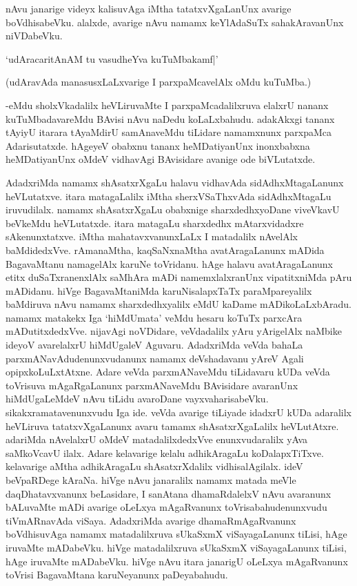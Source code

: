 nAvu janarige videyx kalisuvAga iMtha tatatxvXgaLanUnx avarige boVdhisabeVku. alalxde, avarige nAvu namamx keYlAdaSuTx sahakAravanUnx niVDabeVku.

\begin{shloka}
`udAracaritAnAM tu vasudheYva kuTuMbakamf|'
\end{shloka}

(udAravAda manasusxLaLxvarige I parxpaMcavelAlx oMdu kuTuMba.)

-eMdu sholxVkadalilx heVLiruvaMte I parxpaMcadalilxruva elalxrU nananx kuTuMbadavareMdu BAvisi nAvu naDedu koLaLxbahudu. adakAkxgi tananx tAyiyU itarara tAyaMdirU samAnaveMdu tiLidare namamxnunx parxpaMca Adarisutatxde. hAgeyeV obabxnu tananx heMDatiyanUnx inonxbabxna heMDatiyanUnx oMdeV vidhavAgi BAvisidare avanige ode biVLutatxde.

AdadxriMda namamx shAsatxrXgaLu halavu vidhavAda sidAdhxMtagaLanunx heVLutatxve. itara matagaLalilx iMtha sherxVSaThxvAda sidAdhxMtagaLu iruvudilalx. namamx shAsatxrXgaLu obabxnige sharxdedhxyoDane viveVkavU beVkeMdu heVLutatxde. itara matagaLu sharxdedhx mAtarxvidadxre sAkenunxtatxve. iMtha mahatavxvanunxLaLx I matadalilx nAvelAlx baMdidedxVve. rAmanaMtha, kaqSaNxnaMtha avatAragaLanunx mADida BagavaMtanu namagelAlx karuNe toVridanu. hAge halavu avatAragaLanunx etitx duSaTxranenxlAlx saMhAra mADi namemxlalxranUnx 
vipatitxniMda pAru mADidanu. hiVge BagavaMtaniMda karuNisalapxTaTx paraMpareyalilx baMdiruva nAvu namamx sharxdedhxyalilx eMdU kaDame mADikoLaLxbAradu. namamx matakekx Iga `hiMdUmata' veMdu hesaru koTuTx parxcAra mADutitxdedxVve. nijavAgi noVDidare, veVdadalilx yAru yArigelAlx naMbike ideyoV avarelalxrU hiMdUgaleV Aguvaru. AdadxriMda veVda bahaLa parxmANavAdudenunxvudanunx namamx deVshadavanu yAreV Agali opipxkoLuLxtAtxne. Adare veVda parxmANaveMdu tiLidavaru kUDa veVda toVrisuva mAgaRgaLanunx parxmANaveMdu BAvisidare 
avaranUnx hiMdUgaLeMdeV nAvu tiLidu avaroDane vayxvaharisabeVku. sikakxramatavenunxvudu Iga ide. veVda avarige tiLiyade idadxrU kUDa adaralilx heVLiruva tatatxvXgaLanunx avaru tamamx shAsatxrXgaLalilx heVLutAtxre. adariMda nAvelalxrU oMdeV matadalilxdedxVve enunxvudaralilx yAva saMkoVcavU ilalx. Adare kelavarige kelalu adhikAragaLu koDalapxTiTxve. kelavarige aMtha adhikAragaLu shAsatxrXdalilx vidhisalAgilalx. ideV beVpaRDege kAraNa. hiVge nAvu janaralilx namamx matada meVle daqDhatavxvanunx beLasidare, I sanAtana 
dhamaRdalelxV nAvu avaranunx bALuvaMte mADi avarige oLeLxya mAgaRvanunx toVrisabahudenunxvudu tiVmARnavAda viSaya. AdadxriMda avarige dhamaRmAgaRvanunx boVdhisuvAga namamx matadalilxruva sUkaSxmX viSayagaLanunx tiLisi, hAge iruvaMte mADabeVku. hiVge matadalilxruva sUkaSxmX viSayagaLanunx tiLisi, hAge iruvaMte mADabeVku. hiVge nAvu itara janarigU oLeLxya mAgaRvanunx toVrisi BagavaMtana karuNeyanunx paDeyabahudu.

